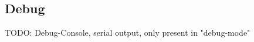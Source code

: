 \subsection{Debug}\label{subsec:debug}
TODO: Debug-Console, serial output, only present in "debug-mode"
